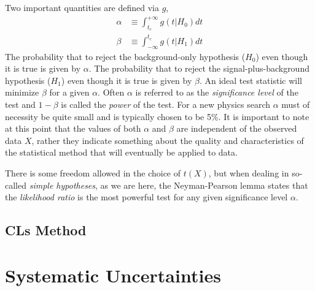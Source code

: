 Two important quantities are defined via $g$,
\begin{align}
    \alpha &\equiv \int_{t_c}^{+ \infty} g(t|H_0)dt \\
    \beta &\equiv \int_{-\infty}^{t_c} g(t|H_1)dt
\end{align}
The probability that to reject the background-only hypothesis ($H_0$) even though it is true is given by $\alpha$.
The probability that to reject the signal-plus-background hypothesis ($H_1$) even though it is true is given by $\beta$.
An ideal test statistic will minimize $\beta$ for a given $\alpha$.
Often $\alpha$ is referred to as the \textit{significance level} of the test and $1-\beta$ is called the \textit{power} of the test.
For a new physics search $\alpha$ must of necessity be quite small and is typically chosen to be 5\%.
It is important to note at this point that the values of both $\alpha$ and $\beta$ are independent of the observed data $X$, rather they indicate something about the quality and characteristics of the statistical method that will eventually be applied to data.

There is some freedom allowed in the choice of $t(X)$, but when dealing in so-called \textit{simple hypotheses}, as we are here, the Neyman-Pearson lemma states that the \textit{likelihood ratio} is the most powerful test for any given significance level $\alpha$.

\subsection{CLs Method}


\section{Systematic Uncertainties}
